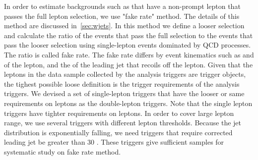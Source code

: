 In order to estimate backgrounds such as \Wjets{} that have a non-prompt 
lepton that passes the full lepton selection, we use "fake rate" method.  
The details of this method are discussed in~\ref{sec:wjets}. 
In this method we define a looser selection and calculate the ratio of the 
events that pass the full selection to the events that pass the looser 
selection using single-lepton events dominated by QCD processes. 
The ratio is called fake rate. The fake rate differs by event kinematics
such as \pt{} and \Eta{} of the lepton, and the \pt{} of the leading jet 
that recoils off the lepton. Given that the leptons in the data sample
collected by the analysis triggers are trigger objects, the tighest possible 
loose definition is the trigger requirements of the analysis triggers.
We devised a set of single-lepton triggers that have the looser or same requirements 
on leptons as the double-lepton triggers. Note that the single lepton triggers 
have tighter requirements on leptons. In order to cover large lepton \pt{} range, 
we use several triggers with different lepton \pt{} thresholds.
Because the jet \pt{} distribution is exponentially falling, 
we need triggers that require corrected leading jet \pt{} be greater than 30 \GeV. 
These triggers give sufficient samples for systematic study on fake rate method. 



